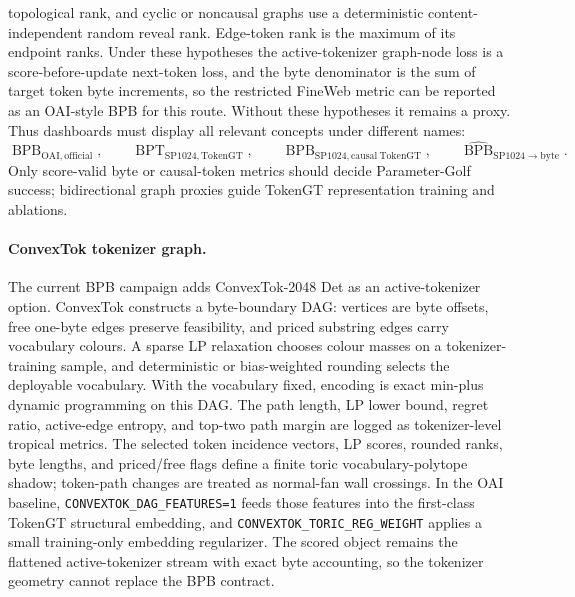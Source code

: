 \documentclass[11pt]{article}
\theoremstyle{definition}
\theoremstyle{plain}
\theoremstyle{remark}
\numberwithin{equation}{section}
\begin{document}
topological rank, and cyclic or noncausal graphs use a deterministic
content-independent random reveal rank.  Edge-token rank is the maximum of
its endpoint ranks.  Under these hypotheses the active-tokenizer graph-node
loss is a score-before-update next-token loss, and the byte denominator is the
sum of target token byte increments, so the restricted FineWeb metric can be
reported as an OAI-style BPB for this route.  Without these hypotheses it
remains a proxy.  Thus dashboards must display all relevant concepts under
different names:
\[
\operatorname{BPB}_{\mathrm{OAI,official}},\qquad
\operatorname{BPT}_{\mathrm{SP1024,TokenGT}},\qquad
\operatorname{BPB}_{\mathrm{SP1024,causal\ TokenGT}},\qquad
\widehat{\operatorname{BPB}}_{\mathrm{SP1024}\to\mathrm{byte}}.
\]
Only score-valid byte or causal-token metrics should decide Parameter-Golf
success; bidirectional graph proxies guide TokenGT representation training
and ablations.

\paragraph{ConvexTok tokenizer graph.}
The current BPB campaign adds ConvexTok-2048 Det as an active-tokenizer option.
ConvexTok constructs a byte-boundary DAG: vertices are byte offsets, free
one-byte edges preserve feasibility, and priced substring edges carry
vocabulary colours.  A sparse LP relaxation chooses colour masses on a
tokenizer-training sample, and deterministic or bias-weighted rounding selects
the deployable vocabulary.  With the vocabulary fixed, encoding is exact
min-plus dynamic programming on this DAG.  The path length, LP lower bound,
regret ratio, active-edge entropy, and top-two path margin are logged as
tokenizer-level tropical metrics.  The selected token incidence vectors, LP
scores, rounded ranks, byte lengths, and priced/free flags define a finite
toric vocabulary-polytope shadow; token-path changes are treated as normal-fan
wall crossings.  In the OAI baseline, \texttt{CONVEXTOK\_DAG\_FEATURES=1}
feeds those features into the first-class TokenGT structural embedding, and
\texttt{CONVEXTOK\_TORIC\_REG\_WEIGHT} applies a small training-only embedding
regularizer.  The scored object remains the flattened active-tokenizer stream
with exact byte accounting, so the tokenizer geometry cannot replace the BPB
contract.
\end{document}
